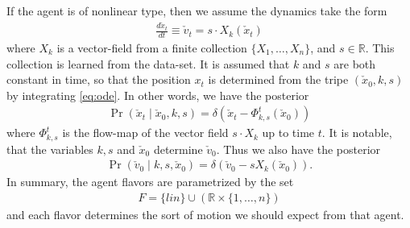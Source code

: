 \documentclass[conference]{IEEEtran}
\begin{document}
If the agent is of nonlinear type, then we assume the dynamics take the form
\begin{align}
	\frac{d \check{x}_t}{dt} \equiv \check{v}_t = s \cdot X_k(\check{x}_t) \label{eq:ode}
\end{align}
where $X_k$ is a vector-field from a finite collection $\{X_1, \dots, X_n\}$, and $s \in \mathbb{R}$.
This collection is learned from the data-set.
It is assumed that $k$ and $s$ are both constant in time, so that the position $x_t$ is determined from the
tripe $(\check{x}_0,k,s)$ by integrating \eqref{eq:ode}.
In other words, we have the posterior
\begin{align*}
	\Pr( \check{x}_t \mid \check{x}_0 , k , s) = \delta( \check{x}_t - \Phi^{t}_{k,s}( \check{x}_0) )
\end{align*}
where $\Phi^{t}_{k,s}$ is the flow-map of the vector field $s \cdot X_k$ up to time $t$.
It is notable, that the variables $k,s$ and $\check{x}_0$ determine $\check{v}_0$.
Thus we also have the posterior
\begin{align*}
	\Pr( \check{v}_0 \mid k,s, \check{x}_0) = \delta( \check{v}_0 -s X_k( \check{x}_0) ).
\end{align*}
In summary, the agent flavors are parametrized by the set
\begin{align*}
	F = \{ lin \} \cup \left( \mathbb{R} \times \{ 1 , \dots, n \} \right)
\end{align*}
and each flavor determines the sort of motion we should expect from that agent.
\end{document}
